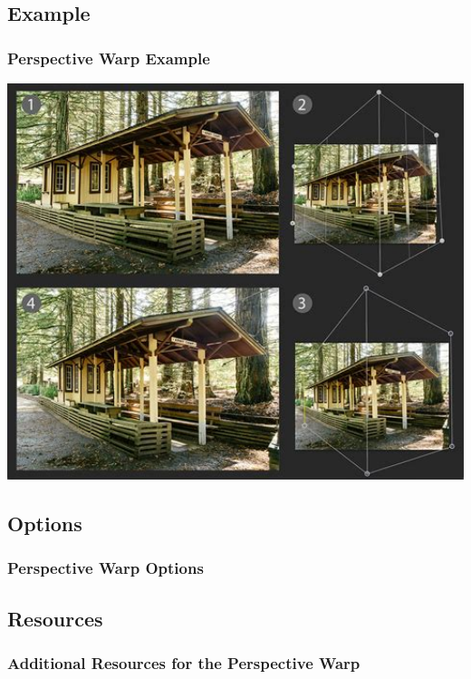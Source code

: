 \documentclass{beamer}
\begin{document}
\subsection{Example}		
\begin{frame}
	\frametitle{Perspective Warp Example}
	\begin{center}
		\includegraphics[width=1.0\textwidth]{images/Perspective Warp example.jpg}
	\end{center}
\end{frame}

\subsection{Options}		
\begin{frame}
	\frametitle{Perspective Warp Options}
	\begin{outline}
		\1 
	\end{outline}
\end{frame}

\subsection{Resources}		
\begin{frame}
	\frametitle{Additional Resources for the Perspective Warp}
	\begin{outline}
		\1 
		\2 
		\2
	\end{outline}
\end{frame}
\end{document}
